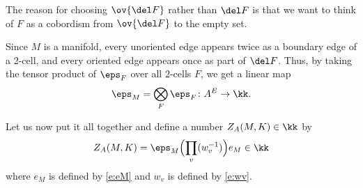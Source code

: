 \begin{remark}
  The reason for choosing $\ov{\del F}$ rather than $\del F$ is that we want
  to think of $F$ as a cobordism from $\ov{\del F}$ to the empty set.
\end{remark}

Since $M$ is a manifold, every unoriented edge appears twice as a boundary
edge of a 2-cell, and every oriented edge appears once as part of $\del F$.
Thus, by taking the tensor product of $\eps_F$ over all 2-cells $F$, we
get a linear map
$$
  \eps_M = \bigotimes_F \eps_F \colon A^E\to \kk.
$$

Let us now put it all together and define a number $Z_A(M,K)\in \kk$ by
\begin{equation}\label{e:fhk-state-sum}
  Z_A(M,K)= \eps_M
          \Bigl(\prod_v(w^{-1}_v) \Bigr)e_M\in \kk
\end{equation}
where $e_M$ is defined by \eqref{e:eM} and $w_v$ is defined by \eqref{e:wv}.


